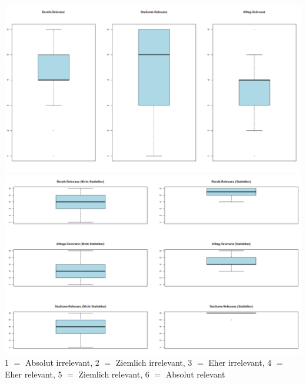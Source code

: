 \documentclass[12pt,a4paper,titlepage=true,parskip,ngerman]{scrartcl}
\begin{document}
\includegraphics[scale=0.49]{3_boxplots_relevanz}\\
\includegraphics[scale=0.49]{(nicht)-statis_boxplots_Relevanz}\\
{\tiny 1 $=$ Absolut irrelevant, 2 $=$ Ziemlich irrelevant, 3 $=$ Eher irrelevant, 4 $=$ Eher relevant, 5 $=$ Ziemlich relevant, 6 $=$ Absolut relevant}\\
\end{document}
